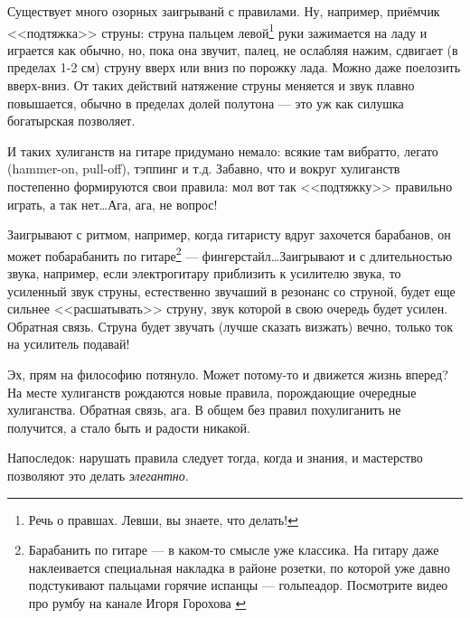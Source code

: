 Существует много озорных заигрыванй с правилами. Ну, например, приёмчик <<подтяжка>> струны: струна пальцем левой\footnote{Речь о правшах. Левши, вы знаете, что делать!} руки зажимается на ладу и играется как обычно, но, пока она звучит, палец, не ослабляя нажим, сдвигает (в пределах 1-2 см) струну вверх или вниз по порожку лада. Можно даже поелозить вверх-вниз. От таких действий натяжение струны меняется и звук плавно повышается, обычно в пределах долей полутона --- это уж как силушка богатырская позволяет. 

И таких хулиганств на гитаре придумано немало: всякие там вибратто, легато (hammer-on, pull-off), тэппинг и т.д. Забавно, что и вокруг хулиганств постепенно формируются свои правила: мол вот так <<подтяжку>> правильно играть, а так нет\ldots Ага, ага, не вопрос!

Заигрывают с ритмом, например, когда гитаристу вдруг захочется барабанов, он может побарабанить по гитаре\footnote{Барабанить по гитаре --- в каком-то смысле уже классика. На гитару даже наклеивается специальная накладка в районе розетки, по которой уже давно подстукивают пальцами горячие испанцы --- гольпеадор. Посмотрите видео про румбу на канале Игоря Горохова \cite{url:gorohovIgor}} --- фингерстайл\ldots Заигрывают и с длительностью звука, например, если электрогитару приблизить к усилителю звука, то усиленный звук струны, естественно звучаший в резонанс со струной, будет еще сильнее <<расшатывать>> струну, звук которой в свою очередь будет усилен. Обратная связь. Струна будет звучать (лучше сказать визжать) вечно, только ток на усилитель подавай!

Эх, прям на философию потянуло. Может потому-то и движется жизнь вперед? На месте хулиганств рождаются новые правила, порождающие очередные хулиганства. Обратная связь, ага. В общем без правил похулиганить не получится, а стало быть и радости никакой.

Напоследок: нарушать правила следует тогда, когда и знания, и мастерство позволяют это делать \emph{элегантно}.